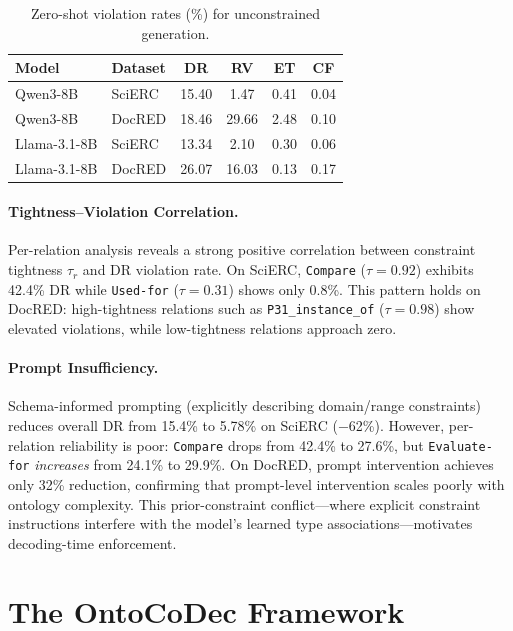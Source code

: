 \documentclass[11pt,a4paper]{article}
\newcommand{\sys}{OntoCoDec}
\begin{document}
\begin{table}[t]
\centering
\small
\caption{Zero-shot violation rates (\%) for unconstrained generation.}
\label{tab:zeroshot-violations}
\begin{tabular}{llcccc}
\toprule
\textbf{Model} & \textbf{Dataset} & \textbf{DR} & \textbf{RV} & \textbf{ET} & \textbf{CF} \\
\midrule
Qwen3-8B & SciERC & 15.40 & 1.47 & 0.41 & 0.04 \\
Qwen3-8B & DocRED & 18.46 & 29.66 & 2.48 & 0.10 \\
Llama-3.1-8B & SciERC & 13.34 & 2.10 & 0.30 & 0.06 \\
Llama-3.1-8B & DocRED & 26.07 & 16.03 & 0.13 & 0.17 \\
\bottomrule
\end{tabular}
\end{table}

\paragraph{Tightness--Violation Correlation.}
Per-relation analysis reveals a strong positive correlation between constraint tightness $\tau_r$ and DR violation rate.
On SciERC, \texttt{Compare} ($\tau=0.92$) exhibits 42.4\% DR while \texttt{Used-for} ($\tau=0.31$) shows only 0.8\%.
This pattern holds on DocRED: high-tightness relations such as \texttt{P31\_instance\_of} ($\tau=0.98$) show elevated violations, while low-tightness relations approach zero.

\paragraph{Prompt Insufficiency.}
Schema-informed prompting (explicitly describing domain/range constraints) reduces overall DR from 15.4\% to 5.78\% on SciERC ($-$62\%).
However, per-relation reliability is poor: \texttt{Compare} drops from 42.4\% to 27.6\%, but \texttt{Evaluate-for} \emph{increases} from 24.1\% to 29.9\%.
On DocRED, prompt intervention achieves only 32\% reduction, confirming that prompt-level intervention scales poorly with ontology complexity.
This prior-constraint conflict---where explicit constraint instructions interfere with the model's learned type associations---motivates decoding-time enforcement.

\section{The \sys{} Framework}
\label{sec:method}
\end{document}
